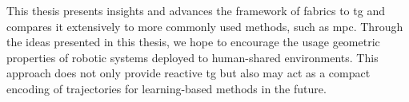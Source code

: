 This thesis presents insights and advances the framework of \ac{fabrics} to
\ac{tg} and compares it extensively to more commonly used methods, such as
\ac{mpc}. Through the ideas presented in this thesis, we hope to encourage the
usage geometric properties of robotic systems deployed to human-shared 
environments. This approach does not only provide reactive \ac{tg} but also may
act as a compact encoding of trajectories for learning-based methods in the
future.










